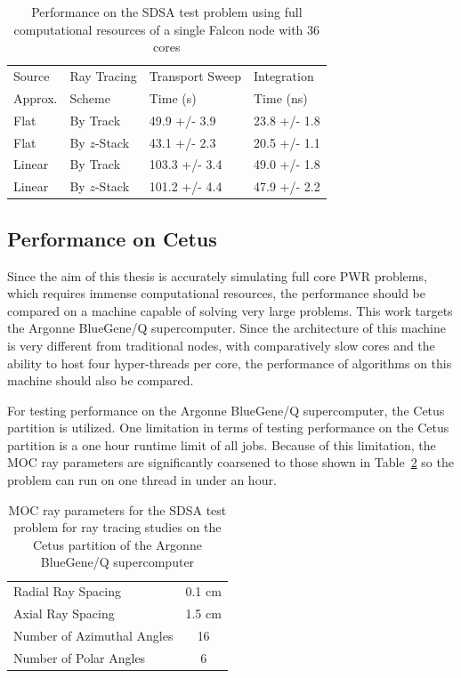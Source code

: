 \begin{table}[ht]
	\centering
	\caption{Performance on the SDSA test problem using full computational resources of a single Falcon node with 36 cores}
	\medskip
	\begin{tabular}{l|l|l|l}
		\hline
		Source &  Ray Tracing & Transport Sweep & Integration \\
		Approx. &  Scheme & Time (s) & Time (ns) \\
		\hline
		Flat & By Track & 49.9 +/- 3.9 & 23.8 +/- 1.8 \\
		Flat & By $z$-Stack & 43.1 +/- 2.3 & 20.5 +/- 1.1 \\
		Linear & By Track & 103.3 +/- 3.4 & 49.0 +/- 1.8 \\
		Linear & By $z$-Stack & 101.2 +/- 4.4 & 47.9 +/- 2.2 \\
		\hline
	\end{tabular}
	\label{tab:rt-full-thread}
\end{table}

\subsection{Performance on Cetus}

Since the aim of this thesis is accurately simulating full core PWR problems, which requires immense computational resources, the performance should be compared on a machine capable of solving very large problems. This work targets the Argonne BlueGene/Q supercomputer. Since the architecture of this machine is very different from traditional nodes, with comparatively slow cores and the ability to host four hyper-threads per core, the performance of algorithms on this machine should also be compared.

For testing performance on the Argonne BlueGene/Q supercomputer, the Cetus partition is utilized. One limitation in terms of testing performance on the Cetus partition is a one hour runtime limit of all jobs. Because of this limitation, the \ac{MOC} ray parameters are significantly coarsened to those shown in Table~\ref{tab:rt-cetus-params} so the problem can run on one thread in under an hour.

\begin{table}[ht]
	\centering
	\caption{MOC ray parameters for the SDSA test problem for ray tracing studies on the Cetus partition of the Argonne BlueGene/Q supercomputer}
	\medskip
	\begin{tabular}{lc}
		\hline
		Radial Ray Spacing & 0.1 cm \\
		Axial Ray Spacing & 1.5 cm \\
		Number of Azimuthal Angles & 16 \\
		Number of Polar Angles & 6 \\
		\hline
	\end{tabular}
	\label{tab:rt-cetus-params}
\end{table}

